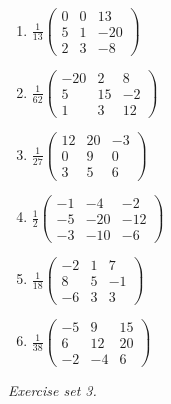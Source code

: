 \begin{enumerate}[label=\arabic*., leftmargin=*, itemsep=1pt]
\item $\frac{1}{13}\left(\begin{smallmatrix}0 & 0 & 13\\ 5 & 1 & -20\\ 2 & 3 & -8\end{smallmatrix}\right)$
\item $\frac{1}{62}\left(\begin{smallmatrix}-20 & 2 & 8\\ 5 & 15 & -2\\ 1 & 3 & 12\end{smallmatrix}\right)$
\item $\frac{1}{27}\left(\begin{smallmatrix}12 & 20 & -3\\ 0 & 9 & 0\\ 3 & 5 & 6\end{smallmatrix}\right)$
\item $\frac{1}{2}\left(\begin{smallmatrix}-1 & -4 & -2\\ -5 & -20 & -12\\ -3 & -10 & -6\end{smallmatrix}\right)$
\item $\frac{1}{18}\left(\begin{smallmatrix}-2 & 1 & 7\\ 8 & 5 & -1\\ -6 & 3 & 3\end{smallmatrix}\right)$
\item $\frac{1}{38}\left(\begin{smallmatrix}-5 & 9 & 15\\ 6 & 12 & 20\\ -2 & -4 & 6\end{smallmatrix}\right)$
\end{enumerate}
\par\noindent\emph{Exercise set 3.}\nopagebreak
